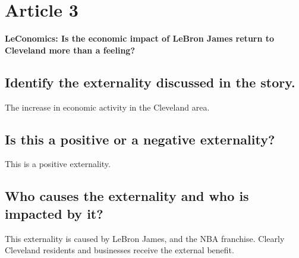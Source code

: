 \documentclass[a4paper]{article}
\begin{document}
\section{Article 3}
\textbf{LeConomics: Is the economic impact of LeBron James return to Cleveland more than a feeling?}


\subsection{Identify the externality discussed in the story.}
The increase in economic activity in the Cleveland area.

\subsection{Is this a positive or a negative externality?}
This is a positive externality.

\subsection{Who causes the externality and who is impacted by it?}
This externality is caused by LeBron James, and the NBA franchise. Clearly Cleveland residents and businesses receive the external benefit.
\end{document}

